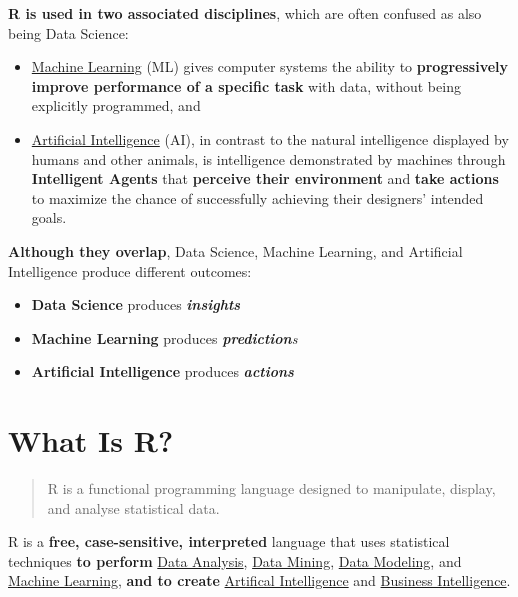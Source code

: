 \documentclass[]{book}
\providecommand{\tightlist}{%
  \setlength{\itemsep}{0pt}\setlength{\parskip}{0pt}}
\theoremstyle{definition}
\theoremstyle{definition}
\theoremstyle{definition}
\theoremstyle{remark}
\begin{document}
\textbf{R is used in two associated disciplines}, which are often
confused as also being Data Science:

\begin{itemize}
\item
  \href{https://en.wikipedia.org/wiki/Machine_learning}{Machine
  Learning} (ML) gives computer systems the ability to
  \textbf{progressively improve performance of a specific task} with
  data, without being explicitly programmed, and
\item
  \href{https://en.wikipedia.org/wiki/Artificial_intelligence}{Artificial
  Intelligence} (AI), in contrast to the natural intelligence displayed
  by humans and other animals, is intelligence demonstrated by machines
  through \textbf{Intelligent Agents} that \textbf{perceive their
  environment} and \textbf{take actions} to maximize the chance of
  successfully achieving their designers' intended goals.
\end{itemize}

\textbf{Although they overlap}, Data Science, Machine Learning, and
Artificial Intelligence produce different outcomes:

\begin{itemize}
\tightlist
\item
  \textbf{Data Science} produces \emph{\textbf{insights}}
\item
  \textbf{Machine Learning} produces \emph{\textbf{prediction}s}
\item
  \textbf{Artificial Intelligence} produces \emph{\textbf{actions}}
\end{itemize}

\hypertarget{what-is-r}{%
\section{What Is R?}\label{what-is-r}}

\begin{quote}
R is a functional programming language designed to manipulate, display,
and analyse statistical data.
\end{quote}

R is a \textbf{free, case-sensitive, interpreted} language that uses
statistical techniques \textbf{to perform}
\href{https://en.wikipedia.org/wiki/Data_analysis}{Data Analysis},
\href{https://en.wikipedia.org/wiki/Data_mining}{Data Mining},
\href{https://en.wikipedia.org/wiki/Data_modeling}{Data Modeling}, and
\href{https://en.wikipedia.org/wiki/Machine_learning}{Machine Learning},
\textbf{and to create}
\href{https://www.innoarchitech.com/python-vs-or-r-artificial-intelligence-ai-machine-learning-data-science-which-use/}{Artifical
Intelligence} and
\href{https://en.wikipedia.org/wiki/Business_intelligence}{Business
Intelligence}.
\end{document}

